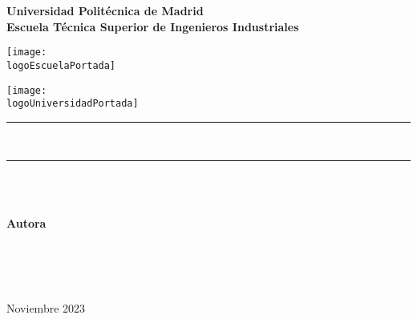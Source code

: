 
\begin{titlepage}



\noindent\begin{minipage}{\textwidth}
\centering
\LARGE\textbf{Universidad Politécnica de Madrid}\\
\Large\textbf{Escuela Técnica Superior de Ingenieros Industriales}
\end{minipage}

\vspace{1cm}

    \begin{minipage}[t]{0.4\textwidth}
        \centering
        \texttt{[image: \\logoEscuelaPortada]}
    \end{minipage}%
    \begin{minipage}[t]{0.6\textwidth}
        \centering
        \texttt{[image: \\logoUniversidadPortada]}
    \end{minipage}
    
\vspace{1cm}


\noindent\rule[-1ex]{\textwidth}{1pt}\\[3.5ex] %
\noindent\begin{minipage}{\textwidth}
\centering
\begin{spacing}{1.5}
{\huge\bfseries \titulo}
\end{spacing}
\noindent\rule[-1ex]{\textwidth}{1pt}\\[3.5ex] %


\vspace{2cm}

\noindent\begin{minipage}{\textwidth}
    \centering 
    \Large\textbf{\tipotrabajo}\\
    \vspace*{8em}
    \textbf{Autora}\\ {\miNombre}\\ {\miTitulacion}\\[2.5ex]
\end{minipage}
\\[2cm]

\vspace*{\fill}

Noviembre 2023
\end{minipage}

\end{titlepage}

\restoregeometry
